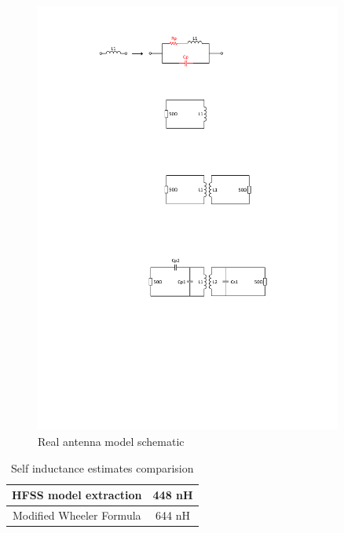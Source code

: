 \documentclass[12pt,a4paper,UKenglish]{article}
\begin{document}
\begin{figure}[!htbp] %
   \centering
   \includegraphics[width=0.9\textwidth]{img/ant_non_ideal.pdf} 
   \caption{Real antenna model schematic}
   \label{fig:ant_non_ideal}
\end{figure}

\begin{table}[!htbp]
\caption{Self inductance estimates comparision} 
\begin{center}
\begin{tabular}{c|c}
\hline \hline
HFSS model extraction & 448 \si{\nano\henry} \\ \hline
Modified Wheeler Formula \cite{ant_inductance_calculation} & 644 \si{\nano\henry}  \\ 
\hline \hline
\end{tabular}
\end{center}
\label{tab:ant_inductance_compare}
\end{table}%
\end{document}
